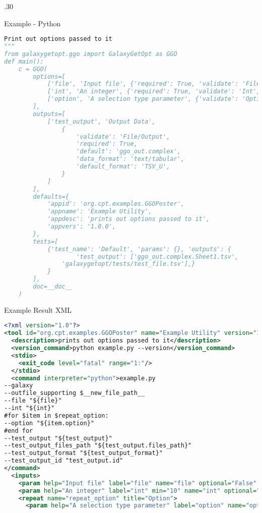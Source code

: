 \documentclass[final,t,20pt]{beamer}
\begin{document}
\begin{frame}[fragile]
\begin{columns}[t]
\begin{column}{.30\linewidth}
\begin{block}{Example - Python}
\begin{lstlisting}[language=python]
Print out options passed to it
"""
from galaxygetopt.ggo import GalaxyGetOpt as GGO
def main():
    c = GGO(
        options=[
            ['file', 'Input file', {'required': True, 'validate': 'File/Input'}],
            ['int', 'An integer', {'required': True, 'validate': 'Int', 'min': 10, 'default': 30}],
            ['option', 'A selection type parameter', {'validate': 'Option', 'options': {'a': 'Alpha', 'b': 'Bravo'}, 'multiple': True }],
        ],
        outputs=[
            ['test_output', 'Output Data',
                {
                    'validate': 'File/Output',
                    'required': True,
                    'default': 'ggo_out.complex',
                    'data_format': 'text/tabular',
                    'default_format': 'TSV_U',
                }
            ]
        ],
        defaults={
            'appid': 'org.cpt.examples.GGOPoster',
            'appname': 'Example Utility',
            'appdesc': 'prints out options passed to it',
            'appvers': '1.0.0',
        },
        tests=[
            {'test_name': 'Default', 'params': {}, 'outputs': {
                    'test_output': ['ggo_out.complex.Sheet1.tsv', 
                'galaxygetopt/tests/test_file.tsv'],}
            }
        ],
        doc=__doc__
    )
                \end{lstlisting}
            \end{block}
            \begin{block}{Example Result XML}
                \tiny
                \begin{lstlisting}[language=xml]
<?xml version="1.0"?>
<tool id="org.cpt.examples.GGOPoster" name="Example Utility" version="1.0.0">
  <description>prints out options passed to it</description>
  <version_command>python example.py --version</version_command>
  <stdio>
    <exit_code level="fatal" range="1:"/>
  </stdio>
  <command interpreter="python">example.py
--galaxy
--outfile_supporting $__new_file_path__
--file "${file}"
--int "${int}"
#for $item in $repeat_option:
--option "${item.option}"
#end for
--test_output "${test_output}"
--test_output_files_path "${test_output.files_path}"
--test_output_format "${test_output_format}"
--test_output_id "test_output.id"
</command>
  <inputs>
    <param help="Input file" label="file" name="file" optional="False" type="data"/>
    <param help="An integer" label="int" min="10" name="int" optional="False" type="integer" value="30"/>
    <repeat name="repeat_option" title="Option">
      <param help="A selection type parameter" label="option" name="option" optional="True" type="select">

\end{lstlisting}
\end{block}
\end{column}
\end{columns}
\end{frame}
\end{document}
